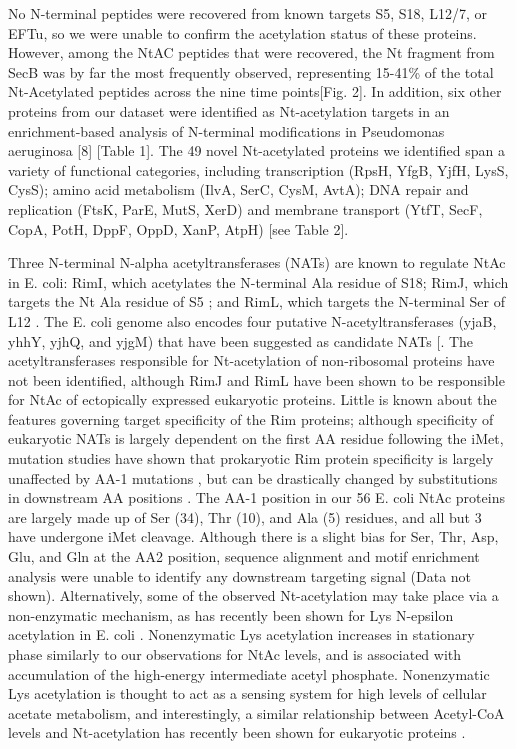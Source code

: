 \documentclass[12pt]{article}
\begin{document}
No N-terminal peptides were recovered from known targets S5, S18, L12/7, or EFTu, so we were unable to confirm the acetylation status of these proteins.  However, among the NtAC peptides that were recovered, the Nt fragment from SecB was by far the most frequently observed, representing 15-41\% of the total Nt-Acetylated peptides across the nine time points[Fig. 2]. In addition, six other proteins from our dataset were identified as Nt-acetylation targets in an enrichment-based analysis of N-terminal modifications in Pseudomonas aeruginosa [8] [Table 1]. The 49 novel Nt-acetylated proteins we identified span a variety of functional categories, including transcription (RpsH, YfgB, YjfH, LysS, CysS); amino acid metabolism (IlvA, SerC, CysM, AvtA); DNA repair and replication (FtsK, ParE, MutS, XerD) and membrane transport (YtfT, SecF, CopA, PotH, DppF, OppD, XanP, AtpH) [see Table 2]. 

Three N-terminal N-alpha acetyltransferases (NATs) are known to regulate NtAc in E. coli: RimI, which acetylates the N-terminal Ala residue of S18; RimJ, which targets the Nt Ala residue of S5  \cite{Yoshikawaetal1987}; and RimL, which targets the N-terminal Ser of L12  \cite{Tanakaetal1989}. The E. coli genome also encodes four putative N-acetyltransferases (yjaB, yhhY, yjhQ, and yjgM) that have been suggested as candidate NATs [\cite{Tanakaetal1989}. The acetyltransferases responsible for Nt-acetylation of non-ribosomal proteins have not been identified, although RimJ  \cite{Bernal-Perezetal2012}\cite{Tanakaetal1989} and RimL \cite{Miaoetal2007} have been shown to be responsible for NtAc of ectopically expressed eukaryotic proteins.  Little is known about the features governing target specificity of the Rim proteins; although specificity of eukaryotic NATs is largely dependent on the first AA residue following the iMet, mutation studies have shown that prokaryotic Rim protein specificity is largely unaffected by AA-1 mutations \cite{Miaoetal2007}, but can be drastically changed by substitutions in downstream AA positions \cite{Charbautetal2002}.  The AA-1 position in our 56 E. coli NtAc proteins are largely made up of Ser (34), Thr (10), and Ala (5) residues, and all but 3 have undergone iMet cleavage.  Although there is a slight bias for Ser, Thr, Asp, Glu, and Gln at the AA2 position, sequence alignment and motif enrichment analysis were unable to identify any downstream targeting signal (Data not shown). Alternatively, some of the observed Nt-acetylation may take place via a non-enzymatic mechanism, as has recently been shown for Lys N-epsilon acetylation in E. coli \cite{Kuhnetal2014} \cite{Weinertetal2013}. Nonenzymatic Lys acetylation increases in stationary phase similarly to our observations for NtAc levels, and is associated with accumulation of the high-energy intermediate acetyl phosphate. Nonenzymatic Lys acetylation is thought to act as a sensing system for high levels of cellular acetate metabolism, and interestingly, a similar relationship between Acetyl-CoA levels and Nt-acetylation has recently been shown for eukaryotic proteins \cite{Yietal2011}. 
\end{document}
